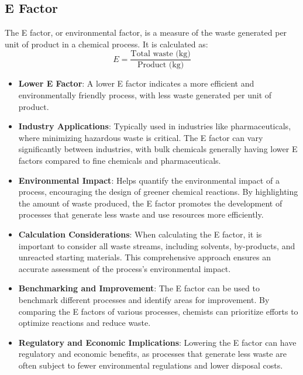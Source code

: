 \documentclass[11pt]{article}
\begin{document}
\subsection{E Factor}
The E factor, or environmental factor, is a measure of the waste generated per unit of product in a chemical process. It is calculated as:
\[
E = \frac{\text{Total waste (kg)}}{\text{Product (kg)}}
\]
\begin{itemize}
    \item \textbf{Lower E Factor}: A lower E factor indicates a more efficient and environmentally friendly process, with less waste generated per unit of product.
    \item \textbf{Industry Applications}: Typically used in industries like pharmaceuticals, where minimizing hazardous waste is critical. The E factor can vary significantly between industries, with bulk chemicals generally having lower E factors compared to fine chemicals and pharmaceuticals.
    \item \textbf{Environmental Impact}: Helps quantify the environmental impact of a process, encouraging the design of greener chemical reactions. By highlighting the amount of waste produced, the E factor promotes the development of processes that generate less waste and use resources more efficiently.
    \item \textbf{Calculation Considerations}: When calculating the E factor, it is important to consider all waste streams, including solvents, by-products, and unreacted starting materials. This comprehensive approach ensures an accurate assessment of the process's environmental impact.
    \item \textbf{Benchmarking and Improvement}: The E factor can be used to benchmark different processes and identify areas for improvement. By comparing the E factors of various processes, chemists can prioritize efforts to optimize reactions and reduce waste.
    \item \textbf{Regulatory and Economic Implications}: Lowering the E factor can have regulatory and economic benefits, as processes that generate less waste are often subject to fewer environmental regulations and lower disposal costs.
\end{itemize}
\end{document}
